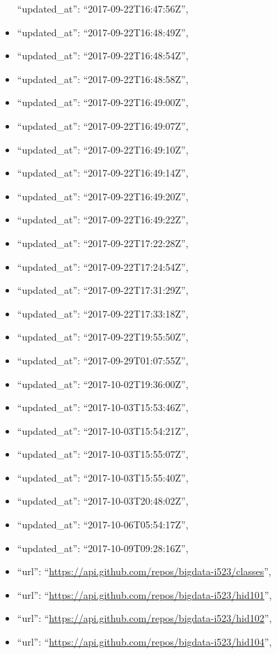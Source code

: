 \begin{itemize}
  ``updated\_at'': ``2017-09-22T16:47:56Z'',
\item
  ``updated\_at'': ``2017-09-22T16:48:49Z'',
\item
  ``updated\_at'': ``2017-09-22T16:48:54Z'',
\item
  ``updated\_at'': ``2017-09-22T16:48:58Z'',
\item
  ``updated\_at'': ``2017-09-22T16:49:00Z'',
\item
  ``updated\_at'': ``2017-09-22T16:49:07Z'',
\item
  ``updated\_at'': ``2017-09-22T16:49:10Z'',
\item
  ``updated\_at'': ``2017-09-22T16:49:14Z'',
\item
  ``updated\_at'': ``2017-09-22T16:49:20Z'',
\item
  ``updated\_at'': ``2017-09-22T16:49:22Z'',
\item
  ``updated\_at'': ``2017-09-22T17:22:28Z'',
\item
  ``updated\_at'': ``2017-09-22T17:24:54Z'',
\item
  ``updated\_at'': ``2017-09-22T17:31:29Z'',
\item
  ``updated\_at'': ``2017-09-22T17:33:18Z'',
\item
  ``updated\_at'': ``2017-09-22T19:55:50Z'',
\item
  ``updated\_at'': ``2017-09-29T01:07:55Z'',
\item
  ``updated\_at'': ``2017-10-02T19:36:00Z'',
\item
  ``updated\_at'': ``2017-10-03T15:53:46Z'',
\item
  ``updated\_at'': ``2017-10-03T15:54:21Z'',
\item
  ``updated\_at'': ``2017-10-03T15:55:07Z'',
\item
  ``updated\_at'': ``2017-10-03T15:55:40Z'',
\item
  ``updated\_at'': ``2017-10-03T20:48:02Z'',
\item
  ``updated\_at'': ``2017-10-06T05:54:17Z'',
\item
  ``updated\_at'': ``2017-10-09T09:28:16Z'',
\item
  ``url'': ``\url{https://api.github.com/repos/bigdata-i523/classes}'',
\item
  ``url'': ``\url{https://api.github.com/repos/bigdata-i523/hid101}'',
\item
  ``url'': ``\url{https://api.github.com/repos/bigdata-i523/hid102}'',
\item
  ``url'': ``\url{https://api.github.com/repos/bigdata-i523/hid104}'',

\end{itemize}
